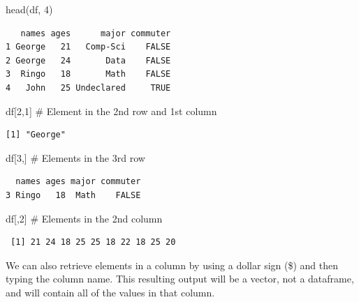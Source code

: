 \documentclass[
  letterpaper,
  DIV=11,
  numbers=noendperiod]{scrreprt}
\newenvironment{Shaded}{\begin{snugshade}}{\end{snugshade}}
\newcommand{\CommentTok}[1]{\textcolor[rgb]{0.37,0.37,0.37}{#1}}
\newcommand{\DecValTok}[1]{\textcolor[rgb]{0.68,0.00,0.00}{#1}}
\newcommand{\FunctionTok}[1]{\textcolor[rgb]{0.28,0.35,0.67}{#1}}
\newcommand{\NormalTok}[1]{\textcolor[rgb]{0.00,0.23,0.31}{#1}}
\newcommand{\SpecialCharTok}[1]{\textcolor[rgb]{0.37,0.37,0.37}{#1}}
\begin{document}
\begin{Shaded}
\begin{Highlighting}[]
\FunctionTok{head}\NormalTok{(df, }\DecValTok{4}\NormalTok{)}
\end{Highlighting}
\end{Shaded}

\begin{verbatim}
   names ages      major commuter
1 George   21   Comp-Sci    FALSE
2 George   24       Data    FALSE
3  Ringo   18       Math    FALSE
4   John   25 Undeclared     TRUE
\end{verbatim}

\begin{Shaded}
\begin{Highlighting}[]
\NormalTok{df[}\DecValTok{2}\NormalTok{,}\DecValTok{1}\NormalTok{] }\CommentTok{\# Element in the 2nd row and 1st column}
\end{Highlighting}
\end{Shaded}

\begin{verbatim}
[1] "George"
\end{verbatim}

\begin{Shaded}
\begin{Highlighting}[]
\NormalTok{df[}\DecValTok{3}\NormalTok{,] }\CommentTok{\# Elements in the 3rd row}
\end{Highlighting}
\end{Shaded}

\begin{verbatim}
  names ages major commuter
3 Ringo   18  Math    FALSE
\end{verbatim}

\begin{Shaded}
\begin{Highlighting}[]
\NormalTok{df[,}\DecValTok{2}\NormalTok{] }\CommentTok{\# Elements in the 2nd column}
\end{Highlighting}
\end{Shaded}

\begin{verbatim}
 [1] 21 24 18 25 25 18 22 18 25 20
\end{verbatim}

We can also retrieve elements in a column by using a dollar sign (\$)
and then typing the column name. This resulting output will be a vector,
not a dataframe, and will contain all of the values in that column.

\begin{Shaded}
\end{Shaded}
\end{document}
